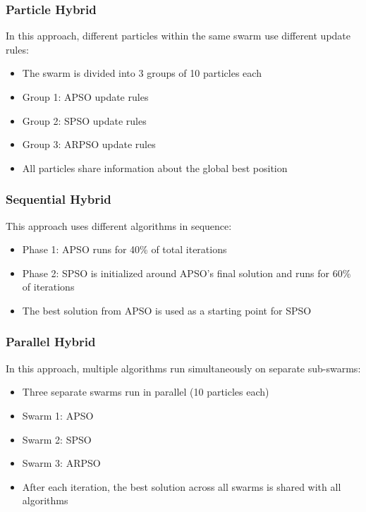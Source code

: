 \documentclass[conference]{IEEEtran}
\begin{document}
\subsubsection{Particle Hybrid}
In this approach, different particles within the same swarm use different update rules:
\begin{itemize}
    \item The swarm is divided into 3 groups of 10 particles each
    \item Group 1: APSO update rules
    \item Group 2: SPSO update rules
    \item Group 3: ARPSO update rules
    \item All particles share information about the global best position
\end{itemize}

\subsubsection{Sequential Hybrid}
This approach uses different algorithms in sequence:
\begin{itemize}
    \item Phase 1: APSO runs for 40\% of total iterations
    \item Phase 2: SPSO is initialized around APSO's final solution and runs for 60\% of iterations
    \item The best solution from APSO is used as a starting point for SPSO
\end{itemize}

\subsubsection{Parallel Hybrid}
In this approach, multiple algorithms run simultaneously on separate sub-swarms:
\begin{itemize}
    \item Three separate swarms run in parallel (10 particles each)
    \item Swarm 1: APSO
    \item Swarm 2: SPSO
    \item Swarm 3: ARPSO
    \item After each iteration, the best solution across all swarms is shared with all algorithms
\end{itemize}
\end{document}
